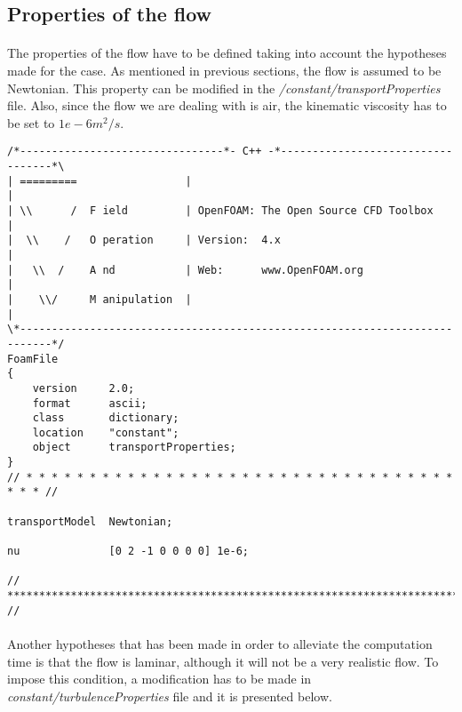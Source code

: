 \subsection{Properties of the flow}

\paragraph{}The properties of the flow have to be defined taking into account the hypotheses made for the case. As mentioned in previous sections, the flow is assumed to be Newtonian. This property can be modified in the \textit{/constant/transportProperties} file. Also, since the flow we are dealing with is air, the kinematic viscosity has to be set to $1e-6 m^2/s$.

\begin{footnotesize}
\begin{verbatim}
/*--------------------------------*- C++ -*----------------------------------*\
| =========                 |                                                 |
| \\      /  F ield         | OpenFOAM: The Open Source CFD Toolbox           |
|  \\    /   O peration     | Version:  4.x                                   |
|   \\  /    A nd           | Web:      www.OpenFOAM.org                      |
|    \\/     M anipulation  |                                                 |
\*---------------------------------------------------------------------------*/
FoamFile
{
    version     2.0;
    format      ascii;
    class       dictionary;
    location    "constant";
    object      transportProperties;
}
// * * * * * * * * * * * * * * * * * * * * * * * * * * * * * * * * * * * * * //

transportModel  Newtonian;

nu              [0 2 -1 0 0 0 0] 1e-6;

// ************************************************************************* //
\end{verbatim}
\end{footnotesize}

\paragraph{}Another hypotheses that has been made in order to alleviate the computation time is that the flow is laminar, although it will not be a very realistic flow. To impose this condition, a modification has to be made in \textit{constant/turbulenceProperties} file and it is presented below.


